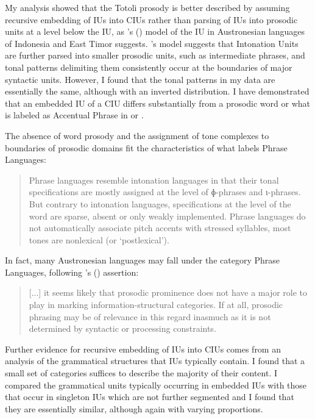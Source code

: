 My analysis showed that the Totoli prosody is better described by assuming recursive embedding of IUs into CIUs rather than  parsing of IUs into prosodic units at a level below the IU, as \citeauthor{Himmelmann_Preliminary_2018}'s (\citeyear[348]{Himmelmann_Preliminary_2018}) model of the IU in Austronesian languages of Indonesia and East Timor suggests. \citeauthor{Himmelmann_Preliminary_2018}'s model suggests that Intonation Units are further parsed into smaller prosodic units, such as intermediate phrases, and tonal patterns delimiting them consistently occur at the boundaries of major syntactic units. However, I found that the tonal patterns in my data are essentially the same, although with an inverted distribution. I have demonstrated that an embedded IU of a CIU differs substantially from a prosodic word or what is labeled as Accentual Phrase   in  or . 


The absence of word prosody and the assignment of tone complexes to boundaries of prosodic domains fit the characteristics of what \citet[270]{Fery_2016}  labels Phrase Languages:

\begin{quotation}
	Phrase languages resemble intonation languages in that their tonal specifications are mostly assigned at the level of ɸ-phrases and ι-phrases. But contrary to intonation languages, specifications at the level of the word are sparse, absent or only weakly implemented. Phrase languages do not automatically associate pitch accents with stressed syllables, most tones are nonlexical (or ‘postlexical’). \citep[270]{Fery_2016}
\end{quotation}



In fact, many Austronesian languages may fall under the category Phrase Languages, following \citeauthor{Himmelmann_Preliminary_2018}'s (\citeyear[347]{Himmelmann_Preliminary_2018}) assertion:

\begin{quote}
	[...] it seems likely
	that prosodic prominence does not have a major role to play in marking information-structural
	categories. If at all, prosodic phrasing may be of relevance in this regard
	inasmuch as it is not determined by syntactic or processing constraints.
\end{quote}



Further evidence for recursive embedding of IUs into CIUs comes from an analysis of the  grammatical structures that IUs typically contain. I found that a small set of categories suffices to describe the majority  of their content. I compared the grammatical units typically occurring in embedded IUs with those that occur in singleton IUs which are not further segmented and I found that they are essentially similar, although again with varying proportions. 


